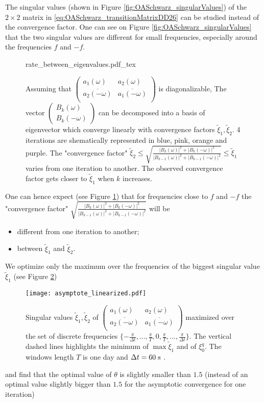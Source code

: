 The singular values (shown in Figure \ref{fig:OASchwarz_singularValues})
of the $2\times 2$ matrix
in \eqref{eq:OASchwarz_transitionMatrixDD26}
can be studied instead of the convergence factor.
One can see on Figure \ref{fig:OASchwarz_singularValues} that
the two singular values are different for small frequencies,
especially around the frequencies $f$ and $-f$.
\begin{figure}
	\centering
	{rate_between_eigenvalues.pdf_tex}
	\caption{Assuming that $\begin{pmatrix}
	a_1(\omega) & a_2(\omega) \\
	\overline{a_2(-\omega)} & \overline{a_1(-\omega)} \\
	\end{pmatrix}$ is diagonalizable,
	The vector
	$\begin{pmatrix} B_k(\omega) \\ B_k(-\omega) \end{pmatrix}$
		can be decomposed
	into a basis of eigenvector which converge linearly with
	convergence factors $\widetilde{\xi}_1, \widetilde{\xi}_2$.
	4 iterations are shematically represented in blue, pink, orange and
	purple. The
	"convergence factor"
	$\widetilde{\xi}_2 \leq \sqrt{\frac{|B_k(\omega)|^2 +
	|B_k(-\omega)|^2}{|B_{k-1}(\omega)|^2
	+ |B_{k-1}(-\omega)|^2}} \leq \widetilde{\xi}_1$
	varies from one iteration to another. The observed convergence
	factor gets closer to $\widetilde{\xi}_1$ when $k$ increases.
	}
	\label{fig:OASchwarz_rateBetweenEigenvalues}
\end{figure}

One can hence expect (see
Figure \ref{fig:OASchwarz_rateBetweenEigenvalues}) that for frequencies close to $f$ and $-f$
the "convergence factor"
$\sqrt{\frac{|B_k(\omega)|^2 +
|B_k(-\omega)|^2}{|B_{k-1}(\omega)|^2 + |B_{k-1}(-\omega)|^2}}$ will be
\begin{itemize}
	\item different from one iteration to another;
	\item between $\widetilde{\xi}_1$ and $\widetilde{\xi}_2$.
\end{itemize}
We optimize only the maximum over the frequencies of the biggest
singular value $\widetilde{\xi}_1$ (see Figure
\ref{fig:OASchwarz_nonasymptotic})
\begin{figure}
    \centering
    \texttt{[image: asymptote\_linearized.pdf]}
	\caption{Singular values
	$\widetilde{\xi}_1, \widetilde{\xi}_2$ of $\begin{pmatrix}
	a_1(\omega) & a_2(\omega) \\
	\overline{a_2(-\omega)} & \overline{a_1(-\omega)} \\
	\end{pmatrix}$ maximized over the set of discrete
	frequencies
	$\{-\frac{\pi}{\Delta t}, ..., \frac{\pi}{T}, 0,
	\frac{\pi}{T},..., \frac{\pi}{\Delta t}\}$.
	The vertical dashed lines highlights the minimum
	of $\max \widetilde{\xi}_1$ and of $\xi_0^q$.
	The windows length $T$ is one day
	and $\Delta t=60\;{\rm s}$ .
	}
    \label{fig:OASchwarz_nonasymptotic}
\end{figure}
and find that the optimal value of $\theta$ is slightly smaller than
$1.5$ (instead of an optimal value slightly bigger than $1.5$
for the asymptotic convergence for one iteration)
